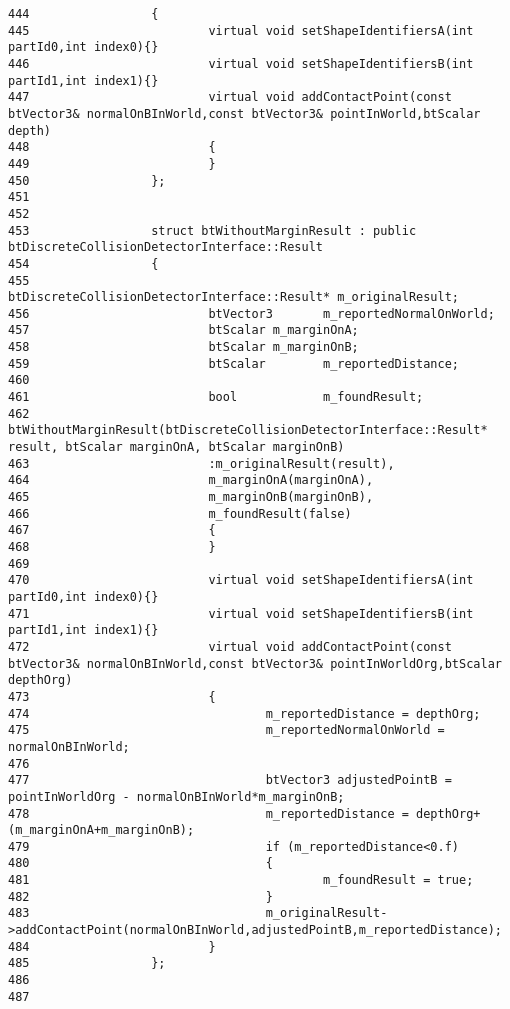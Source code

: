 \begin{Code}
\begin{verbatim}
444                 {
445                         virtual void setShapeIdentifiersA(int partId0,int index0){}
446                         virtual void setShapeIdentifiersB(int partId1,int index1){}
447                         virtual void addContactPoint(const btVector3& normalOnBInWorld,const btVector3& pointInWorld,btScalar depth) 
448                         {
449                         }
450                 };
451 
452                 
453                 struct btWithoutMarginResult : public btDiscreteCollisionDetectorInterface::Result
454                 {
455                         btDiscreteCollisionDetectorInterface::Result* m_originalResult;
456                         btVector3       m_reportedNormalOnWorld;
457                         btScalar m_marginOnA;
458                         btScalar m_marginOnB;
459                         btScalar        m_reportedDistance;
460                         
461                         bool            m_foundResult;
462                         btWithoutMarginResult(btDiscreteCollisionDetectorInterface::Result* result, btScalar marginOnA, btScalar marginOnB)
463                         :m_originalResult(result),
464                         m_marginOnA(marginOnA),
465                         m_marginOnB(marginOnB),
466                         m_foundResult(false)
467                         {
468                         }
469                         
470                         virtual void setShapeIdentifiersA(int partId0,int index0){}
471                         virtual void setShapeIdentifiersB(int partId1,int index1){}
472                         virtual void addContactPoint(const btVector3& normalOnBInWorld,const btVector3& pointInWorldOrg,btScalar depthOrg) 
473                         {
474                                 m_reportedDistance = depthOrg;
475                                 m_reportedNormalOnWorld = normalOnBInWorld;
476                                 
477                                 btVector3 adjustedPointB = pointInWorldOrg - normalOnBInWorld*m_marginOnB;
478                                 m_reportedDistance = depthOrg+(m_marginOnA+m_marginOnB);
479                                 if (m_reportedDistance<0.f)
480                                 {
481                                         m_foundResult = true;                                   
482                                 }
483                                 m_originalResult->addContactPoint(normalOnBInWorld,adjustedPointB,m_reportedDistance);
484                         }
485                 };
486 
487                 

\end{verbatim}
\end{Code}
